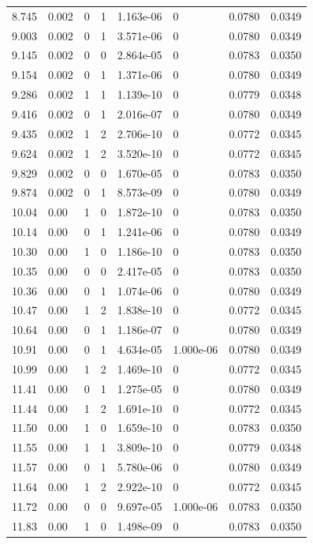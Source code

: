 \documentclass[preview]{standalone}
\begin{document}
{{{\begin{tabular}{L{1.2cm}C{1.2cm} C{0.3cm}C{0.5cm} C{1.4cm}C{1.4cm} C{1.4cm}C{1.4cm}}
  8.745  &  0.002  & 0     &  1 &  1.163e-06  & 0  & 0.0780 &  0.0349   \\ 
  9.003  &  0.002  & 0     &  1 &  3.571e-06  & 0  & 0.0780 &  0.0349   \\ 
  9.145  &  0.002  & 0     &  0 &  2.864e-05  & 0  & 0.0783 &  0.0350   \\ 
  9.154  &  0.002  & 0     &  1 &  1.371e-06  & 0  & 0.0780 &  0.0349   \\ 
  9.286  &  0.002  & 1     &  1 &  1.139e-10  & 0  & 0.0779 &  0.0348   \\ 
  9.416  &  0.002  & 0     &  1 &  2.016e-07  & 0  & 0.0780 &  0.0349   \\ 
  9.435  &  0.002  & 1     &  2 &  2.706e-10  & 0  & 0.0772 &  0.0345   \\ 
  9.624  &  0.002  & 1     &  2 &  3.520e-10  & 0  & 0.0772 &  0.0345   \\ 
  9.829  &  0.002  & 0     &  0 &  1.670e-05  & 0  & 0.0783 &  0.0350   \\ 
  9.874  &  0.002  & 0     &  1 &  8.573e-09  & 0  & 0.0780 &  0.0349   \\ 
  10.04  &  0.00  & 1     &  0 &  1.872e-10  & 0  & 0.0783 &  0.0350   \\ 
  10.14  &  0.00  & 0     &  1 &  1.241e-06  & 0  & 0.0780 &  0.0349   \\ 
  10.30  &  0.00  & 1     &  0 &  1.186e-10  & 0  & 0.0783 &  0.0350   \\ 
  10.35  &  0.00  & 0     &  0 &  2.417e-05  & 0  & 0.0783 &  0.0350   \\ 
  10.36  &  0.00  & 0     &  1 &  1.074e-06  & 0  & 0.0780 &  0.0349   \\ 
  10.47  &  0.00  & 1     &  2 &  1.838e-10  & 0  & 0.0772 &  0.0345   \\ 
  10.64  &  0.00  & 0     &  1 &  1.186e-07  & 0  & 0.0780 &  0.0349   \\ 
  10.91  &  0.00  & 0     &  1 &  4.634e-05  & 1.000e-06  & 0.0780 &  0.0349   \\ 
  10.99  &  0.00  & 1     &  2 &  1.469e-10  & 0  & 0.0772 &  0.0345   \\ 
  11.41  &  0.00  & 0     &  1 &  1.275e-05  & 0  & 0.0780 &  0.0349   \\ 
  11.44  &  0.00  & 1     &  2 &  1.691e-10  & 0  & 0.0772 &  0.0345   \\ 
  11.50  &  0.00  & 1     &  0 &  1.659e-10  & 0  & 0.0783 &  0.0350   \\ 
  11.55  &  0.00  & 1     &  1 &  3.809e-10  & 0  & 0.0779 &  0.0348   \\ 
  11.57  &  0.00  & 0     &  1 &  5.780e-06  & 0  & 0.0780 &  0.0349   \\ 
  11.64  &  0.00  & 1     &  2 &  2.922e-10  & 0  & 0.0772 &  0.0345   \\ 
  11.72  &  0.00  & 0     &  0 &  9.697e-05  & 1.000e-06  & 0.0783 &  0.0350   \\ 
  11.83  &  0.00  & 1     &  0 &  1.498e-09  & 0  & 0.0783 &  0.0350   \\ 
\hline 
\end{tabular} 

}}}
\end{document}
